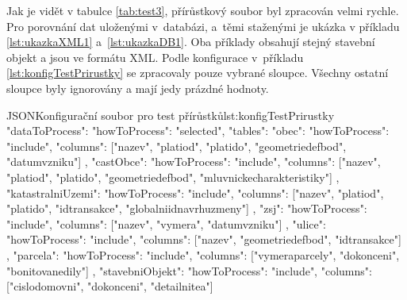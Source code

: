 Jak je vidět v tabulce \ref{tab:test3}, přírůstkový soubor byl zpracován velmi rychle.
Pro porovnání dat uloženými v~databázi, a~těmi staženými je ukázka v příkladu 
\ref{lst:ukazkaXML1} a~\ref{lst:ukazkaDB1}.
Oba příklady obsahují stejný stavební objekt a jsou ve formátu XML.
Podle konfigurace v~příkladu \ref{lst:konfigTestPrirustky} se zpracovaly pouze vybrané sloupce.
Všechny ostatní sloupce byly ignorovány a mají jedy prázdné hodnoty.

\newpage

\begin{code}{JSON}{Konfigurační soubor pro test přírůstků}{lst:konfigTestPrirustky}
  {
    "dataToProcess": {
      "howToProcess": "selected",
      "tables": {
        "obec": {
          "howToProcess": "include",
          "columns": ["nazev", "platiod", "platido", "geometriedefbod", "datumvzniku"]
        },
        "castObce": {
          "howToProcess": "include",
          "columns": ["nazev", "platiod", "platido", "geometriedefbod", "mluvnickecharakteristiky"]
        },
        "katastralniUzemi": {
          "howToProcess": "include",
          "columns": ["nazev", "platiod", "platido", "idtransakce", "globalniidnavrhuzmeny"]
        },
        "zsj": {
          "howToProcess": "include",
          "columns": ["nazev", "vymera", "datumvzniku"]
        },
        "ulice": {
          "howToProcess": "include",
          "columns": ["nazev", "geometriedefbod", "idtransakce"]
        },
        "parcela": {
          "howToProcess": "include",
          "columns": ["vymeraparcely", "dokonceni", "bonitovanedily"]
        },
        "stavebniObjekt": {
          "howToProcess": "include",
          "columns": ["cislodomovni", "dokonceni", "detailnitea"]
        }
      }
    }
  }
\end{code}

\newpage


